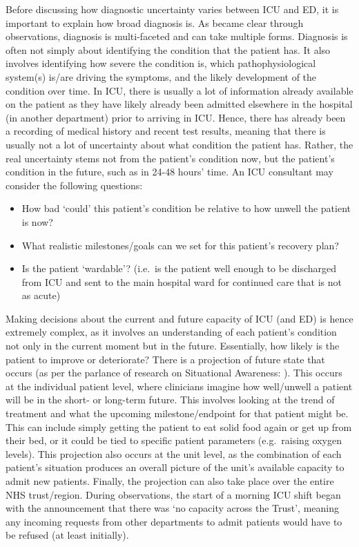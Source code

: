 \documentclass[a4paper, nobind]{templates/ociamthesis}
\providecommand{\tightlist}{%
  \setlength{\itemsep}{0pt}\setlength{\parskip}{0pt}}
\begin{document}
\hfill\break
Before discussing how diagnostic uncertainty varies between ICU and ED, it is important to explain how broad diagnosis is. As became clear through observations, diagnosis is multi-faceted and can take multiple forms. Diagnosis is often not simply about identifying the condition that the patient has. It also involves identifying how severe the condition is, which pathophysiological system(s) is/are driving the symptoms, and the likely development of the condition over time. In ICU, there is usually a lot of information already available on the patient as they have likely already been admitted elsewhere in the hospital (in another department) prior to arriving in ICU. Hence, there has already been a recording of medical history and recent test results, meaning that there is usually not a lot of uncertainty about what condition the patient has. Rather, the real uncertainty stems not from the patient's condition now, but the patient's condition in the future, such as in 24-48 hours' time. An ICU consultant may consider the following questions:\\

\begin{itemize}
\tightlist
\item
  How bad `could' this patient's condition be relative to how unwell the patient is now?
\item
  What realistic milestones/goals can we set for this patient's recovery plan?
\item
  Is the patient `wardable'? (i.e.~is the patient well enough to be discharged from ICU and sent to the main hospital ward for continued care that is not as acute)
\end{itemize}

\hfill\break
Making decisions about the current and future capacity of ICU (and ED) is hence extremely complex, as it involves an understanding of each patient's condition not only in the current moment but in the future. Essentially, how likely is the patient to improve or deteriorate? There is a projection of future state that occurs (as per the parlance of research on Situational Awareness: \textcite{endsley_toward_1995}). This occurs at the individual patient level, where clinicians imagine how well/unwell a patient will be in the short- or long-term future. This involves looking at the trend of treatment and what the upcoming milestone/endpoint for that patient might be. This can include simply getting the patient to eat solid food again or get up from their bed, or it could be tied to specific patient parameters (e.g.~raising oxygen levels). This projection also occurs at the unit level, as the combination of each patient's situation produces an overall picture of the unit's available capacity to admit new patients. Finally, the projection can also take place over the entire NHS trust/region. During observations, the start of a morning ICU shift began with the announcement that there was `no capacity across the Trust', meaning any incoming requests from other departments to admit patients would have to be refused (at least initially).
\end{document}
